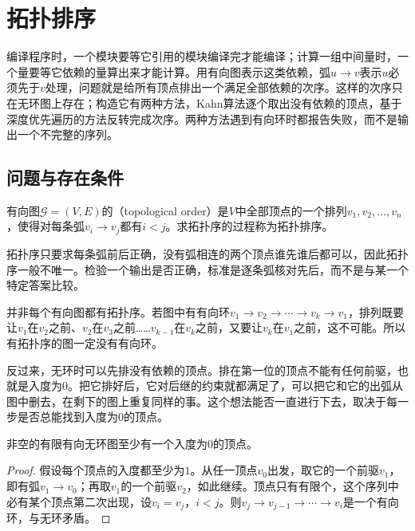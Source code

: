\section{拓扑排序}
\label{sec:graph-topological-order}

编译程序时，一个模块要等它引用的模块编译完才能编译；计算一组中间量时，一个量要等它依赖的量算出来才能计算。用有向图表示这类依赖，弧$u\to v$表示$u$必须先于$v$处理，问题就是给所有顶点排出一个满足全部依赖的次序。这样的次序只在无环图上存在；构造它有两种方法，Kahn算法逐个取出没有依赖的顶点，基于深度优先遍历的方法反转完成次序。两种方法遇到有向环时都报告失败，而不是输出一个不完整的序列。

\subsection{问题与存在条件}
\label{sec:graph-trav-topo-problem}

\begin{definition}[拓扑序]
\label{def:graph-trav-topological-order}
有向图$\mathcal G=(V,E)$的（topological order）是$V$中全部顶点的一个排列$v_1,v_2,\ldots,v_n$，使得对每条弧$v_i\to v_j$都有$i<j$。求拓扑序的过程称为拓扑排序。
\end{definition}

拓扑序只要求每条弧前后正确，没有弧相连的两个顶点谁先谁后都可以，因此拓扑序一般不唯一。检验一个输出是否正确，标准是逐条弧核对先后，而不是与某一个特定答案比较。

并非每个有向图都有拓扑序。若图中有有向环$v_1\to v_2\to\cdots\to v_k\to v_1$，排列既要让$v_1$在$v_2$之前、$v_2$在$v_3$之前……$v_{k-1}$在$v_k$之前，又要让$v_k$在$v_1$之前，这不可能。所以有拓扑序的图一定没有有向环。

反过来，无环时可以先排没有依赖的顶点。排在第一位的顶点不能有任何前驱，也就是入度为$0$。把它排好后，它对后继的约束就都满足了，可以把它和它的出弧从图中删去，在剩下的图上重复同样的事。这个想法能否一直进行下去，取决于每一步是否总能找到入度为$0$的顶点。

\begin{lemma}[有向无环图有源点]
\label{lem:graph-trav-dag-source}
非空的有限有向无环图至少有一个入度为$0$的顶点。
\end{lemma}

\begin{proof}
假设每个顶点的入度都至少为$1$。从任一顶点$v_0$出发，取它的一个前驱$v_1$，即有弧$v_1\to v_0$；再取$v_1$的一个前驱$v_2$，如此继续。顶点只有有限个，这个序列中必有某个顶点第二次出现，设$v_i=v_j$，$i<j$。则$v_j\to v_{j-1}\to\cdots\to v_i$是一个有向环，与无环矛盾。
\end{proof}

